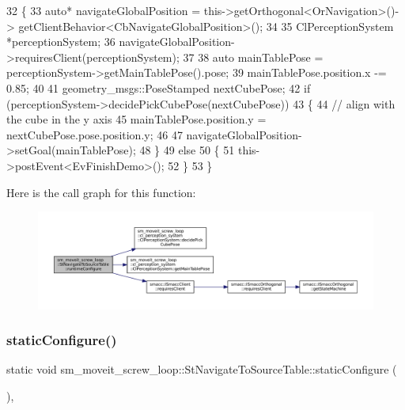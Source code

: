 \begin{DoxyCode}
32         \{
33             \textcolor{keyword}{auto}* navigateGlobalPosition = this->getOrthogonal<OrNavigation>()->
      getClientBehavior<CbNavigateGlobalPosition>();
34             
35             ClPerceptionSystem *perceptionSystem;
36             navigateGlobalPosition->requiresClient(perceptionSystem);
37 
38             \textcolor{keyword}{auto} mainTablePose = perceptionSystem->getMainTablePose().pose;
39             mainTablePose.position.x -= 0.85;
40 
41             geometry\_msgs::PoseStamped nextCubePose;
42             \textcolor{keywordflow}{if} (perceptionSystem->decidePickCubePose(nextCubePose))
43             \{
44                 \textcolor{comment}{// align with the cube in the y axis}
45                 mainTablePose.position.y = nextCubePose.pose.position.y;
46 
47                 navigateGlobalPosition->setGoal(mainTablePose);
48             \}
49             \textcolor{keywordflow}{else}
50             \{
51                 this->postEvent<EvFinishDemo>();
52             \}
53         \}
\end{DoxyCode}
Here is the call graph for this function\+:
\nopagebreak
\begin{figure}[H]
\begin{center}
\leavevmode
\includegraphics[width=350pt]{structsm__moveit__screw__loop_1_1StNavigateToSourceTable_aeb84c31aecd2ec86b6dddb51fc4845b9_cgraph}
\end{center}
\end{figure}
\mbox{\label{structsm__moveit__screw__loop_1_1StNavigateToSourceTable_ac50931fb8aef27c066122288c497416b}} 
\subsubsection{\texorpdfstring{static\+Configure()}{staticConfigure()}}
{\footnotesize\ttfamily static void sm\+\_\+moveit\+\_\+screw\+\_\+loop\+::\+St\+Navigate\+To\+Source\+Table\+::static\+Configure (\begin{DoxyParamCaption}{ }\end{DoxyParamCaption})\hspace{0.3cm}{\ttfamily [inline]}, {\ttfamily [static]}}



